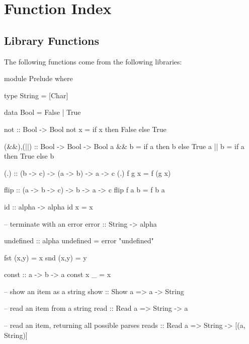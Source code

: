 
\chapter{Function Index}




\printindex


\section{Library Functions}

\begin{comment}
\begin{code}
import Prelude(Char)
ellipses = undefined
\end{code}
\end{comment}


The following functions come from the following libraries:

\begin{code}
module Prelude where

type String = [Char]

data Bool = False | True

not :: Bool -> Bool
not x = if x then False else True

(&&),(||) :: Bool -> Bool -> Bool
a && b = if a then b else True
a || b = if a then True else b

(.) :: (b -> c) -> (a -> b) -> a -> c
(.) f g x = f (g x)

flip :: (a -> b -> c) -> b -> a -> c
flip f a b = f b a

id :: alpha -> alpha
id x = x

-- terminate with an error
error :: String -> alpha

undefined :: alpha
undefined = error "undefined"

fst (x,y) = x
snd (x,y) = y

const                   :: a -> b -> a
const x _               =  x

-- show an item as a string
show :: Show a => a -> String

-- read an item from a string
read :: Read a => String -> a

-- read an item, returning all possible parses
reads :: Read a => String -> [(a, String)]
\end{code}

